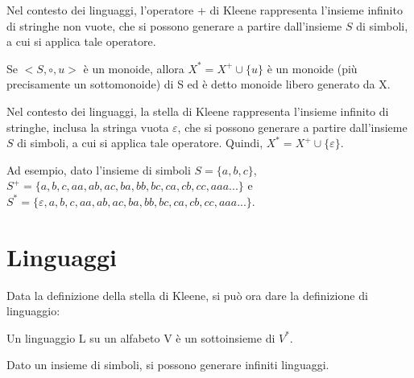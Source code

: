   Nel contesto dei linguaggi, l'operatore + di Kleene rappresenta l'insieme infinito di stringhe non vuote, che si possono generare a partire dall'insieme \(S\) di simboli, a cui si applica tale operatore.

  \begin{definition} 
    Se \(<S, \circ, u>\) è un monoide, allora \(X^*=X^+\cup\{u\}\) è un monoide (più precisamente un sottomonoide) di S ed è detto monoide libero generato da X.
  \end{definition} 

  Nel contesto dei linguaggi, la stella di Kleene rappresenta l'insieme infinito di stringhe, inclusa la stringa vuota \(\varepsilon\), che si possono generare a partire dall'insieme \(S\) di simboli, a cui si applica tale operatore. Quindi, \(X^*=X^+\cup \{\varepsilon\}\).

  Ad esempio, dato l'insieme di simboli \(S=\{a,b,c\}\), \(S^+=\{a,b,c,aa,ab,ac,ba,bb,bc,ca,cb,cc,aaa...\}\) e \(S^*=\{\varepsilon,a,b,c,aa,ab,ac,ba,bb,bc,ca,cb,cc,aaa...\}\). 

  \section{Linguaggi} 
  Data la definizione della stella di Kleene, si può ora dare la definizione di linguaggio:
  \begin{definition} [Linguaggio]
    Un linguaggio L su un alfabeto V è un sottoinsieme di \(V^*\).
  \end{definition}
  Dato un insieme di simboli, si possono generare infiniti linguaggi.
  
  \vspace{10pt}


